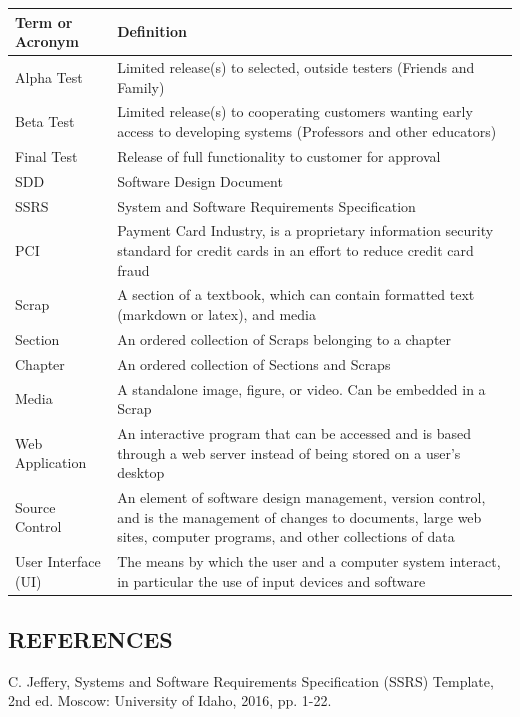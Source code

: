 \documentclass[letterpaper, 10pt, draftclsnofoot, compsoc, onecolumn]{IEEEtran}
\begin{document}
\begin{center}

\tablehead{}
\begin{supertabular}{|p{3cm}|p{12cm}|}
\hline
Term or Acronym & Definition\\\hline
Alpha Test & Limited release(s) to selected, outside testers (Friends and Family)\\ \hline
Beta Test & Limited release(s) to cooperating customers wanting early access to developing systems (Professors 
and other educators)\\ \hline
Final Test & Release of full functionality to customer for approval \\ \hline
SDD & Software Design Document \\ \hline
SSRS & System and Software Requirements Specification \\ \hline
PCI & Payment Card Industry, is a proprietary information security standard for credit cards in an effort to reduce credit card fraud \\ \hline
Scrap & A section of a textbook, which can contain formatted text (markdown or latex), and media \\ \hline
Section & An ordered collection of Scraps belonging to a chapter\\ \hline
Chapter & An ordered collection of Sections and Scraps\\ \hline
Media & A standalone image, figure, or video. Can be embedded in a Scrap\\ \hline
Web Application & An interactive program that can be accessed and is based through a web server instead of 
being stored on a user's desktop\\ \hline
Source Control & An element of software design management, version control, and is the 
management of changes to documents, large web sites, computer programs, and other 
collections of data \\ \hline
User Interface (UI)  & The means by which the user and a computer system interact, in particular the use of 
input devices and software\\ \hline
\end{supertabular}

\end{center}
\subsection[REFERENCES]{\rmfamily\bfseries\color{black} REFERENCES}

{\noindent
[1] C.  Jeffery, Systems and Software Requirements Specification (SSRS) Template, 2nd ed. Moscow: University of Idaho, 2016, pp. 1-22.}
\end{document}
